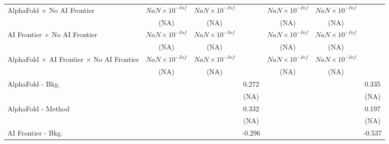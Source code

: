 \begin{tabular}{lcccccc}
   AlphaFold $\times$ No AI Frontier                                          & $NaN\times 10^{-Inf}$  & $NaN\times 10^{-Inf}$  &                        & $NaN\times 10^{-Inf}$  & $NaN\times 10^{-Inf}$  &   \\   
                                                                              & (NA)                   & (NA)                   &                        & (NA)                   & (NA)                   &   \\   
   AI Frontier $\times$ No AI Frontier                                        & $NaN\times 10^{-Inf}$  & $NaN\times 10^{-Inf}$  &                        & $NaN\times 10^{-Inf}$  & $NaN\times 10^{-Inf}$  &   \\   
                                                                              & (NA)                   & (NA)                   &                        & (NA)                   & (NA)                   &   \\   
   AlphaFold $\times$ AI Frontier $\times$ No AI Frontier                     & $NaN\times 10^{-Inf}$  & $NaN\times 10^{-Inf}$  &                        & $NaN\times 10^{-Inf}$  & $NaN\times 10^{-Inf}$  &   \\   
                                                                              & (NA)                   & (NA)                   &                        & (NA)                   & (NA)                   &   \\   
   AlphaFold - Bkg.                                                           &                        &                        & 0.272                  &                        &                        & 0.335\\   
                                                                              &                        &                        & (NA)                   &                        &                        & (NA)\\   
   AlphaFold - Method                                                         &                        &                        & 0.332                  &                        &                        & 0.197\\   
                                                                              &                        &                        & (NA)                   &                        &                        & (NA)\\   
   AI Frontier - Bkg.                                                         &                        &                        & -0.296                 &                        &                        & -0.537\\   

\end{tabular}
